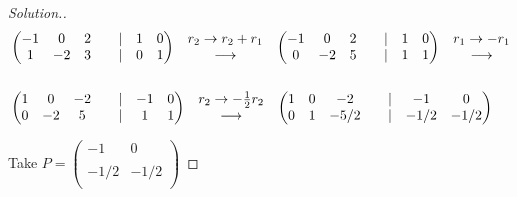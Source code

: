 \documentclass[11pt,a4paper]{article}
\theoremstyle{definition}
\newenvironment{solution}
  {\renewcommand{\qedsymbol}{}\begin{proof}[\textit{Solution}.]}
  {\end{proof}}
\begin{document}
\begin{solution}
\begin{align*}
&
\begin{pmatrix}
-1&0&2&&|&1&0\\1&-2&3&&|&0&1\\
\end{pmatrix}
\hspace{0.3cm}
\begin{matrix}
r_2\rightarrow r_2+r_1\\ \longrightarrow\\
\end{matrix}
\hspace{0.3cm}
\begin{pmatrix}
-1&0&2&&|&1&0\\0&-2&5&&|&1&1\\
\end{pmatrix}
\hspace{0.3cm}
\begin{matrix}
r_1\rightarrow -r_1\\ \longrightarrow\\
\end{matrix}\\\\
&
\begin{pmatrix}
1&0&-2&&|&-1&0\\0&-2&5&&|&1&1\\
\end{pmatrix}
\hspace{0.3cm}
\begin{matrix}
r_2\rightarrow -\frac{1}{2}r_2\\ \longrightarrow\\
\end{matrix}
\hspace{0.3cm}
\begin{pmatrix}
1&0&-2&&|&-1&0\\0&1&-5/2&&|&-1/2&-1/2\\
\end{pmatrix}\\
\end{align*}

Take $P=
\begin{pmatrix}
-1&0\\\\-1/2&-1/2\\
\end{pmatrix}
$


\end{solution}
\end{document}
